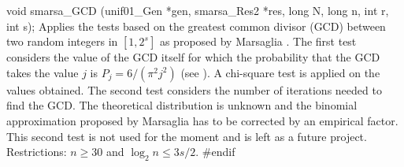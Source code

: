 void smarsa_GCD (unif01_Gen *gen, smarsa_Res2 *res,
                 long N, long n, int r, int s);
\endcode
 \tab Applies the tests based on the greatest common divisor (GCD) between
%
  two random integers in $[1, 2^s]$ as proposed by Marsaglia \cite{rMAR02b}.
  The first test considers the value of the GCD itself for which the
  probability that the GCD takes the value $j$ is $P_j = 6/(\pi^2 j^2)$
  (see \cite{rKNU98a}).
  A chi-square test is applied on the values obtained.
  The second test considers the number of iterations needed to find the
  GCD. The theoretical distribution is unknown and the binomial
  approximation proposed by Marsaglia has to be corrected by an empirical
  factor. This second test is not used for the moment and is left as a
  future project.
  Restrictions: $n \ge 30$ and $\log_2 n \le 3s/2$.
 \endtab
\code
\hide
#endif
\endhide
\endcode
